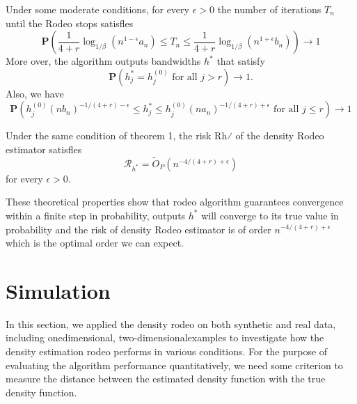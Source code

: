 \begin{theorem}
    Under some moderate conditions, for every $\epsilon>0$ the number of iterations $T_n$ until the Rodeo stops satisfles
    \begin{equation}
        \mathbf{P}\left(\frac{1}{4+r} \log _{1 / \beta}\left(n^{1-\epsilon} a_{n}\right) \leq T_{n} \leq \frac{1}{4+r} \log _{1 / \beta}\left(n^{1+\epsilon} b_{n}\right)\right) \longrightarrow 1
    \end{equation}
    More over, the algorithm outputs bandwidths $h^*$ that satisfy
    \begin{equation}
        \mathbf{P}\left(h_{j}^{*}=h_{j}^{(0)} \text { for all } j>r\right) \longrightarrow 1.
    \end{equation}
    Also, we have
    \begin{equation}
        \mathbf{P}\left(h_{j}^{(0)}\left(n b_{n}\right)^{-1 /(4+r)-\epsilon} \leq h_{j}^{*} \leq h_{j}^{(0)}\left(n a_{n}\right)^{-1 /(4+r)+\epsilon} \text { for all } j \leq r\right) \longrightarrow 1
    \end{equation}
\end{theorem}

\begin{theorem}
    Under the same condition of theorem 1, the risk Rh⁄ of the density Rodeo estimator satisfles
    \begin{equation}
        \mathcal{R}_{h^{*}}=\tilde{O}_{P}\left(n^{-4 /(4+r)+\epsilon}\right)
    \end{equation}
    for every $\epsilon>0$.
\end{theorem}

These theoretical properties show that rodeo algorithm guarantees convergence within a finite step in probability, outputs $h^*$ will converge to its true value in probability and the risk of density Rodeo estimator is of order $n^{-4/(4+r)+\epsilon}$ which is the optimal order we can expect. 

\section{Simulation}
\label{sec:sim}

In this section, we applied the density rodeo on both synthetic and real data, including onedimensional, two-dimensionalexamples to investigate how the density estimation rodeo performs in various conditions. 
For the purpose of evaluating the algorithm performance quantitatively, we need some criterion to measure the distance between the estimated density function with the true density function. 


